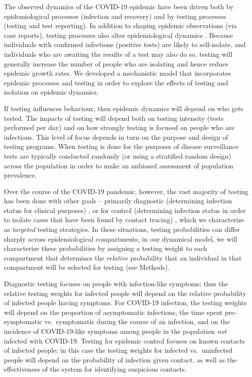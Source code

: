\documentclass[smallextended]{svjour3}       %
\newcommand{\covid}{COVID-19\xspace}
\DeclareRobustCommand\_{\ifmmode\expandafter\subtxt\else\textunderscore\fi}
\begin{document}
The observed dynamics of the \covid epidemic have been driven both by epidemiological processes (infection and recovery) and by testing processes (testing and test reporting). In addition to shaping epidemic observations (via case reports), testing processes also alter epidemiological dynamics \citep{peto2020covid,taipale2020population}. Because individuals with confirmed infections (positive tests) are likely to self-isolate, and individuals who are awaiting the results of a test may also do so, testing will generally increase the number of people who are isolating and hence reduce epidemic growth rates. We developed a mechanistic model that incorporates epidemic processes and testing in order to explore the effects of testing and isolation on epidemic dynamics.

If testing influences behaviour, then epidemic dynamics will depend on who gets tested.
The impacts of testing will depend both on testing intensity (tests performed per day) and on how strongly testing is focused on people who are infectious.
This level of focus depends in turn on the purpose and design of testing programs. 
When testing is done for the purposes of disease surveillance \citep{foddai2020base}
tests are typically conducted randomly (or using a stratified random design) across the population in order to make an unbiased assessment of population prevalence.

Over the course of the \covid pandemic, however, the vast majority of testing has been done with other goals --
primarily diagnostic (determining infection status for clinical purposes) \citep{phua2020intensive,who2020global}, or for control (determining  infection status in order to isolate cases that have been found by contact tracing) \citep{aleta2020modelling,kucharski2020effectiveness,grassly2020comparison,smith2020adherence}, which we characterize as \emph{targeted} testing strategies.
In these situations, testing probabilities can differ sharply across epidemiological compartments; in our dynamical model, we will characterize these probabilities by assigning a testing weight to each compartment that determines the \emph{relative} probability that an individual in that compartment will be selected for testing (see Methods). 

Diagnostic testing focuses on people with infection-like symptoms; thus the relative testing weights for infected people will depend on the relative probability of infected people having symptoms. For \covid infection, the testing weights will depend on the proportion of asymptomatic infections, the time spent pre-symptomatic vs.\ symptomatic during the course of an infection, and on the incidence of \covid-like symptoms among people in the population \emph{not} infected with \covid. Testing for epidemic control focuses on known contacts of infected people; in this case the testing weights for infected vs.\ uninfected people will depend on the probability of infection given contact, as well as the effectiveness of the system for identifying suspicious contacts.
\end{document}
